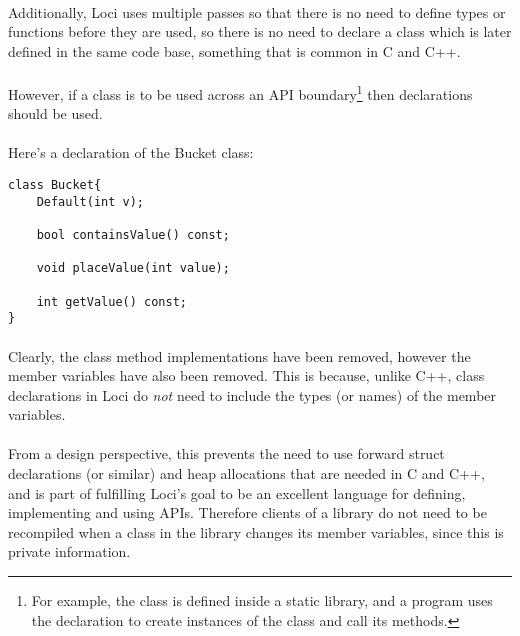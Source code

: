 \documentclass[12pt,twoside,notitlepage]{report}
\begin{document}
\paragraph{}
Additionally, Loci uses multiple passes so that there is no need to define types or functions before they are used, so there is no need to declare a class which is later defined in the same code base, something that is common in C and C++.

\paragraph{}
However, if a class is to be used across an API boundary\footnote{For example, the class is defined inside a static library, and a program uses the declaration to create instances of the class and call its methods.} then declarations should be used.

\paragraph{}
Here's a declaration of the Bucket class:


\begin{lstlisting}
class Bucket{
	Default(int v);

	bool containsValue() const;
	
	void placeValue(int value);
	
	int getValue() const;
}
\end{lstlisting}


\paragraph{}
Clearly, the class method implementations have been removed, however the member variables have also been removed. This is because, unlike C++, class declarations in Loci do \emph{not} need to include the types (or names) of the member variables.

\paragraph{}
From a design perspective, this prevents the need to use forward struct declarations (or similar) and heap allocations that are needed in C and C++, and is part of fulfilling Loci's goal to be an excellent language for defining, implementing and using APIs. Therefore clients of a library do not need to be recompiled when a class in the library changes its member variables, since this is private information.
\end{document}
